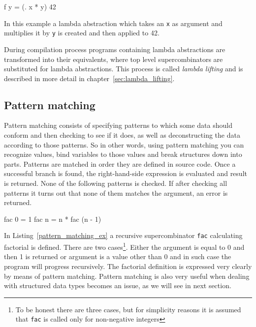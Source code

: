 \documentclass[12pt,a4paper]{report}
\begin{document}
\vspace*{0.2in}
\begin{code}[style=haskell,label=lambda_ex,caption={Lambda abstraction}]
f y = (\x . x * y) 42
\end{code}

In this example a lambda abstraction which takes an \texttt{x} as argument and
multiplies it by \texttt{y} is created and then applied to 42.

During compilation process programs containing lambda abstractions are
transformed into their equivalents, where top level supercombinators are
substituted for lambda abstractions. This process is called \textit{lambda
lifting} and is described in more detail in chapter~\ref{sec:lambda_lifting}.

\subsection{Pattern matching}

Pattern matching consists of specifying patterns to which some data should
conform and then checking to see if it does, as well as deconstructing the data
according to those patterns. So in other words, using pattern matching you can
recognize values, bind variables to those values and break structures down into
parts.
Patterns are matched in order they are defined in source code. Once a
successful branch is found, the right-hand-side expression is evaluated and
result is returned. None of the following patterns is checked. If after checking
all patterns it turns out that none of them matches the argument, an error is
returned.

\vspace*{0.2in}
\begin{code}[style=haskell,label=pattern_matching_ex,caption={Factorial using pattern matching.}]
fac 0 = 1
fac n = n * fac (n - 1)
\end{code}

In Listing~\ref{pattern_matching_ex} a recursive supercombinator \texttt{fac}
calculating factorial is defined. There are two cases\footnote{To be honest
there are three cases, but for simplicity reasons it is assumed that
\texttt{fac} is called only for non-negative integers}. Either the argument is
equal to 0 and then 1 is returned or argument is a value other than 0 and in
such case the program will progress recursively. The factorial definition is
expressed very clearly by means of pattern matching. Pattern matching is also
very useful when dealing with structured data types becomes an issue, as we
will see in next section.
\end{document}
